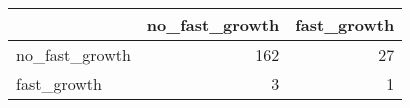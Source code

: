 
\begin{tabular}{lrr}
\toprule
  & no\_fast\_growth & fast\_growth\\
\midrule
no\_fast\_growth & 162 & 27\\
fast\_growth & 3 & 1\\
\bottomrule
\end{tabular}